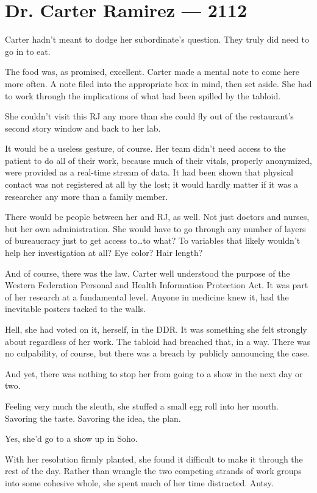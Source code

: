 \hypertarget{dr-carter-ramirez-2112}{%
\chapter*{Dr. Carter Ramirez — 2112}\label{dr-carter-ramirez-2112}}

Carter hadn't meant to dodge her subordinate's question. They truly did need to go in to eat.

The food was, as promised, excellent. Carter made a mental note to come here more often. A note filed into the appropriate box in mind, then set aside. She had to work through the implications of what had been spilled by the tabloid.

She couldn't visit this RJ any more than she could fly out of the restaurant's second story window and back to her lab.

It would be a useless gesture, of course. Her team didn't need access to the patient to do all of their work, because much of their vitals, properly anonymized, were provided as a real-time stream of data. It had been shown that physical contact was not registered at all by the lost; it would hardly matter if it was a researcher any more than a family member.

There would be people between her and RJ, as well. Not just doctors and nurses, but her own administration. She would have to go through any number of layers of bureaucracy just to get access to\ldots{}to what? To variables that likely wouldn't help her investigation at all? Eye color? Hair length?

And of course, there was the law. Carter well understood the purpose of the Western Federation Personal and Health Information Protection Act. It was part of her research at a fundamental level. Anyone in medicine knew it, had the inevitable posters tacked to the walls.

Hell, she had voted on it, herself, in the DDR. It was something she felt strongly about regardless of her work. The tabloid had breached that, in a way. There was no culpability, of course, but there was a breach by publicly announcing the case.

And yet, there was nothing to stop her from going to a show in the next day or two.

Feeling very much the sleuth, she stuffed a small egg roll into her mouth. Savoring the taste. Savoring the idea, the plan.

Yes, she'd go to a show up in Soho.

With her resolution firmly planted, she found it difficult to make it through the rest of the day. Rather than wrangle the two competing strands of work groups into some cohesive whole, she spent much of her time distracted. Antsy.

